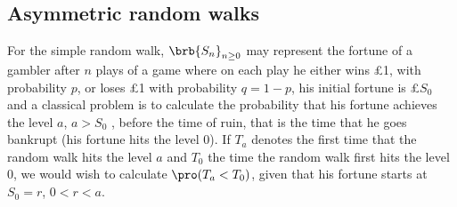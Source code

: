 \subsection{Asymmetric random walks}

\begin{example}\label{exa:randam_walk_simple}
For the simple random walk, $\brb{S_n}_{n\geq 0}$ may represent the fortune of a gambler after $n$ plays of a game where on each play he either wins \pounds 1, with probability $p$, or loses \pounds 1 with probability $q =
1-p$, his initial fortune is \pounds $S_0$ and a classical problem is to calculate the probability that his fortune achieves the level $a$, $a > S_0$ , before the time of ruin, that is the time that he goes bankrupt (his
fortune hits the level 0). If $T_a$ denotes the first time that the random walk hits the level $a$ and $T_0$ the time the random walk first hits the level 0, we would wish to calculate $\pro (T_a < T_0)$, given that his
fortune starts at $S_0 = r$, $0 < r < a$.

\end{example}
